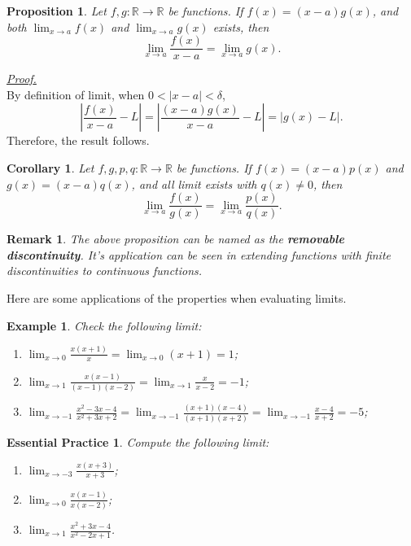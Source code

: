 \documentclass[12pt]{article}
\newtheorem*{corollary}{Corollary}
\newtheorem*{proposition}{Proposition}
\newtheorem*{remark}{Remark}
\newtheorem*{example}{Example}
\newtheorem{exercise}{Essential Practice}[section]
\renewenvironment{proof}[1][Proof]{\begin{snugshade*} \underline{\textit{{#1}.}}\\}{\hfill \qedsymbol \end{snugshade*}}
\begin{document}
    \begin{proposition}
        Let $f,g:\mathbb{R}\to\mathbb{R}$ be functions. If $f(x)=(x-a)g(x)$, and both $\lim_{x\to a} f(x)$ and $\lim_{x\to a}g(x)$ exists, then \[\lim_{x\to a}\frac{f(x)}{x-a}=\lim_{x\to a}g(x).\]
    \end{proposition}

    \begin{proof}
        By definition of limit, when $0<|x-a|<\delta$, \[|\frac{f(x)}{x-a}-L|=|\frac{(x-a)g(x)}{x-a}-L|=|g(x)-L|.\] Therefore, the result follows.
    \end{proof}

    \begin{corollary}
        Let $f,g,p,q:\mathbb{R}\to\mathbb{R}$ be functions. If $f(x)=(x-a)p(x)$ and $g(x)=(x-a)q(x)$, and all limit exists with $q(x)\neq 0$, then \[\lim_{x\to a}\frac{f(x)}{g(x)}=\lim_{x\to a}\frac{p(x)}{q(x)}.\]
    \end{corollary}

    \begin{remark}
        The above proposition can be named as the \textbf{removable discontinuity}. It's application can be seen in extending functions with finite discontinuities to continuous functions.
    \end{remark}

    Here are some applications of the properties when evaluating limits.

    \begin{example}
        Check the following limit:
        \begin{enumerate}
            \item $\displaystyle \lim_{x\to 0}\frac{x(x+1)}{x}=\lim_{x\to 0}(x+1)=1$;
            \item $\displaystyle \lim_{x\to 1}\frac{x(x-1)}{(x-1)(x-2)}=\lim_{x\to 1}\frac{x}{x-2}=-1$;
            \item $\displaystyle \lim_{x\to -1}\frac{x^2-3x-4}{x^2+3x+2}=\lim_{x\to -1}\frac{(x+1)(x-4)}{(x+1)(x+2)}=\lim_{x\to -1}\frac{x-4}{x+2}=-5$;
        \end{enumerate}
    \end{example}

    \begin{exercise}
        Compute the following limit:
        \begin{enumerate}
            \item $\displaystyle \lim_{x\to -3}\frac{x(x+3)}{x+3}$;
            \item $\displaystyle \lim_{x\to 0}\frac{x(x-1)}{x(x-2)}$;
            \item $\displaystyle \lim_{x\to 1}\frac{x^2+3x-4}{x^2-2x+1}$.
        \end{enumerate}
    \end{exercise}
\end{document}
